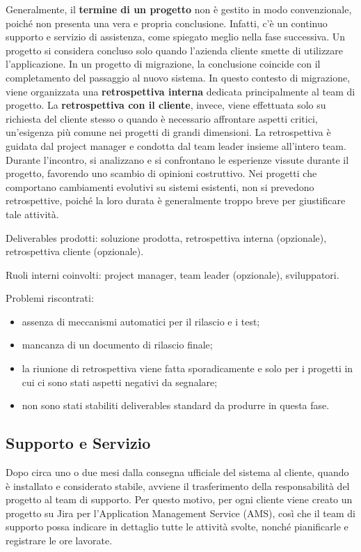         Generalmente, il \textbf{termine di un progetto} non è gestito in modo convenzionale, poiché non presenta una vera e propria conclusione. Infatti, c'è un continuo
        supporto e servizio di assistenza, come spiegato meglio nella fase successiva. Un progetto si considera concluso solo quando l'azienda cliente smette di utilizzare l'applicazione.        
        In un progetto di migrazione, la conclusione coincide con il completamento del passaggio al nuovo sistema.
        In questo contesto di migrazione, viene organizzata una \textbf{retrospettiva
        interna} dedicata principalmente al team di progetto. La \textbf{retrospettiva con il cliente}, invece, viene effettuata solo su richiesta del cliente stesso o quando è
        necessario affrontare aspetti critici, un’esigenza più comune nei progetti di grandi dimensioni.
        La retrospettiva è guidata dal project manager e condotta dal team leader insieme all’intero team. Durante l’incontro, si analizzano e si confrontano le esperienze
        vissute durante il progetto, favorendo uno scambio di opinioni costruttivo.
        Nei progetti che comportano cambiamenti evolutivi su sistemi esistenti, non si prevedono retrospettive, poiché la loro durata è generalmente troppo breve per giustificare tale attività.
        
        Deliverables prodotti: soluzione prodotta, retrospettiva interna (opzionale), retrospettiva cliente (opzionale).

        Ruoli interni coinvolti: project manager, team leader (opzionale), sviluppatori.

        Problemi riscontrati:
        \begin{itemize}
            \item assenza di meccanismi automatici per il rilascio e i test;
            \item mancanza di un documento di rilascio finale;            
            \item la riunione di retrospettiva viene fatta sporadicamente e solo per i progetti in cui ci sono stati aspetti negativi da segnalare;
            \item non sono stati stabiliti deliverables standard da produrre in questa fase.
        \end{itemize}

    \subsection{Supporto e Servizio}
    Dopo circa uno o due mesi dalla consegna ufficiale del sistema al cliente, quando è installato e considerato stabile, avviene il trasferimento della
    responsabilità del progetto al team di supporto. Per questo motivo, per ogni cliente viene creato un progetto su Jira per l'Application Management Service (AMS),
    così che il team di supporto possa indicare in dettaglio tutte le attività svolte, nonché pianificarle e registrare le ore lavorate.

